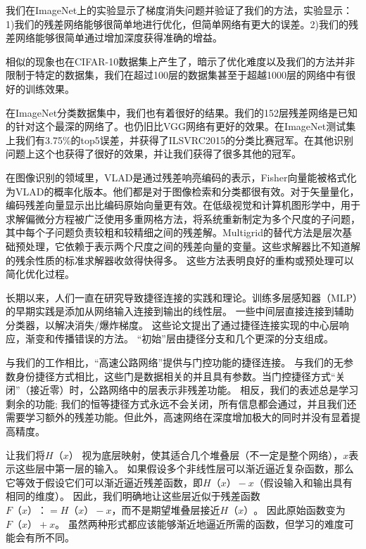 我们在ImageNet上的实验显示了梯度消失问题并验证了我们的方法，实验显示：1)我们的残差网络能够很简单地进行优化，但简单网络有更大的误差。2)我们的残差网络能够很简单通过增加深度获得准确的增益。

相似的现象也在CIFAR-10数据集上产生了，暗示了优化难度以及我们的方法并非限制于特定的数据集，我们在超过100层的数据集甚至于超越1000层的网络中有很好的训练效果。

在ImageNet分类数据集中，我们也有着很好的结果。我们的152层残差网络是已知的针对这个最深的网络了。也仍旧比VGG网络有更好的效果。在ImageNet测试集上我们有3.75\%的top5误差，并获得了ILSVRC2015的分类比赛冠军。在其他识别问题上这个也获得了很好的效果，并让我们获得了很多其他的冠军。



在图像识别的领域里，VLAD是通过残差响亮编码的表示，Fisher向量能被格式化为VLAD的概率化版本。他们都是对于图像检索和分类都很有效。对于矢量量化，编码残差向量显示出比编码原始向量更有效。在低级视觉和计算机图形学中，用于求解偏微分方程被广泛使用多重网格方法，将系统重新制定为多个尺度的子问题，其中每个子问题负责较粗和较精细之间的残差解。Multigrid的替代方法是层次基础预处理，它依赖于表示两个尺度之间的残差向量的变量。这些求解器比不知道解的残余性质的标准求解器收敛得快得多。 这些方法表明良好的重构或预处理可以简化优化过程。


长期以来，人们一直在研究导致捷径连接的实践和理论。训练多层感知器（MLP）的早期实践是添加从网络输入连接到输出的线性层。 一些中间层直接连接到辅助分类器，以解决消失/爆炸梯度。 这些论文提出了通过捷径连接实现的中心层响应，渐变和传播错误的方法。 “初始”层由捷径分支和几个更深的分支组成。

与我们的工作相比，“高速公路网络”提供与门控功能的捷径连接。 与我们的无参数身份捷径方式相比，这些门是数据相关的并且具有参数。当门控捷径方式“关闭”（接近零）时，公路网络中的层表示非残差功能。 相反，我们的表述总是学习剩余的功能; 我们的恒等捷径方式永远不会关闭，所有信息都会通过，并且我们还需要学习额外的残差功能。但此外，高速网络在深度增加极大的同时并没有显着提高精度。



让我们将$ H（x）$ 视为底层映射，使其适合几个堆叠层（不一定是整个网络），$x$表示这些层中第一层的输入。 如果假设多个非线性层可以渐近逼近复杂函数，那么它等效于假设它们可以渐近逼近残差函数，即$H（x）-x$（假设输入和输出具有相同的维度）。 因此，我们明确地让这些层近似于残差函数$F（x）：= H（x） -  x$，而不是期望堆叠层接近$H（x）$。 因此原始函数变为$F（x）+ x$。 虽然两种形式都应该能够渐近地逼近所需的函数，但学习的难度可能会有所不同。

